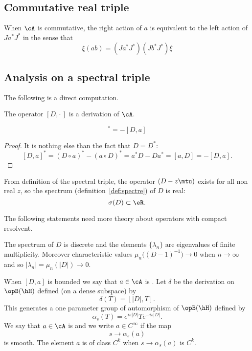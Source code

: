 \subsection{Commutative real triple}

When $\cA$ is commutative, the right action of $a$ is equivalent to the left action of $Ja^*J^*$ in the sense that
\[
  \xi(ab)=(Ja^*J^*)(Jb^*J^*)\xi
\]

\subsection{Analysis on a spectral triple}

The following is a direct computation.
\begin{lemma}
The operator $[D,\cdot\,]$ is a derivation of $\cA$.
\end{lemma}

\begin{lemma}
\begin{equation}
  [D,a]^*=-[D,a]
\end{equation}

\end{lemma}
\begin{proof}
It is nothing else than the fact that $D=D^*$:
\[
  [D,a]^*=(D\circ a)^*-(a\circ D)^*=a^*D-Da^*=[a,D]=-[D,a].
\]

\end{proof}

From definition of the spectral triple, the operator $(D-z\mtu)$ exists for all non real $z$, so the spectrum (definition~\ref{def:spectre}) of $D$ is real:
\[
  \sigma(D)\subset \eR.
\]

\begin{probleme}
	The following statements need more theory about operators with compact resolvent.
\end{probleme}

The spectrum of $D$ is discrete and the elements $\{ \lambda_n \}$ are eigenvalues of finite multiplicity. Moreover characteristic values $\mu_n\big( (D-1)^{-1} \big)\to 0$ when $n\to\infty$ and so $| \lambda_n |=\mu_n(| D |)\to0$.

When $[D,a]$ is bounded we say that $a\in\cA$ is . Let $\delta$ be the derivation on $\opB(\hH)$ defined (on a dense subspace) by
\[
  \delta(T)=[| D |,T].
\]
This generates a one parameter group of automorphism of $\opB(\hH)$ defined by
\begin{equation}
\alpha_s(T)= e^{is| D |}T e^{-is| D |}.
\end{equation}
We say that $a\in\cA$ is  and we write $a\in C^{\infty}$ if the map
\[
  s\to\alpha_s(a)
\]
is smooth. The element $a$ is of class $C^k$ when $s\to\alpha_s(a)$ is $C^k$.

